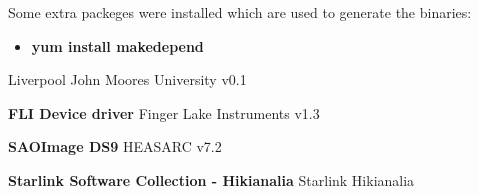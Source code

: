 \documentclass[10pt,a4paper]{article}
\begin{document}
Some extra packeges were installed which are used to generate the binaries:

\begin{itemize}
\item {\bf yum install makedepend}
\end{itemize}

\begin{thebibliography}{99}

Liverpool John Moores University   v0.1

 {\bf FLI Device driver}
Finger Lake Instruments  v1.3

 {\bf SAOImage DS9}
HEASARC  v7.2

 {\bf Starlink Software Collection - Hikianalia}
Starlink  Hikianalia

\end{thebibliography}
\end{document}
